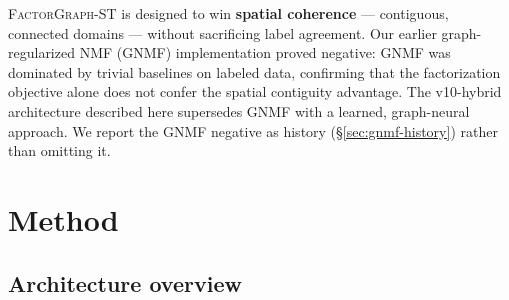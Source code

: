 \documentclass[10pt,letterpaper]{article}
\begin{document}
\textsc{FactorGraph-ST} is designed to win \textbf{spatial coherence} --- contiguous,
connected domains --- without sacrificing label agreement. Our earlier graph-regularized
NMF (GNMF) implementation proved negative: GNMF was dominated by trivial baselines on
labeled data, confirming that the factorization objective alone does not confer the spatial
contiguity advantage. The v10-hybrid architecture described here supersedes GNMF with a
learned, graph-neural approach. We report the GNMF negative as history
(\S\ref{sec:gnmf-history}) rather than omitting it.

\section{Method}
\label{sec:method}

\subsection{Architecture overview}
\label{sec:arch}
\end{document}

